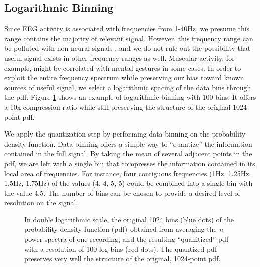 \subsection{Logarithmic Binning}

Since EEG activity is associated with frequencies from 1-40Hz, we presume this range contains the majority of relevant signal. However, this frequency range can be polluted with non-neural signals \cite{ball2009signal}, and we do not rule out the possibility that useful signal exists in other frequency ranges as well. Muscular activity, for example, might be correlated with mental gestures in some cases. In order to exploit the entire frequency spectrum while preserving our bias toward known sources of useful signal, we select a logarithmic spacing of the data bins through the pdf. Figure \ref{binnedEEGpowerspec} shows an example of logarithmic binning with 100 bins. It offers a 10x compression ratio while still preserving the structure of the original 1024-point pdf.

We apply the quantization step by performing data binning on the probability density function. Data binning offers a simple way to ``quantize'' the information contained in the full signal. By taking the mean of several adjacent points in the pdf, we are left with a single bin that compresses the information contained in its local area of frequencies. For instance, four contiguous frequencies (1Hz, 1.25Hz, 1.5Hz, 1.75Hz) of the values (4, 4, 5, 5) could be combined into a single bin with the value 4.5. The number of bins can be chosen to provide a desired level of  resolution on the signal.


\begin{figure}[!h]
  \vspace{-0.2cm}
  \centering
  {}
\caption{In double logarithmic scale, the original 1024 bins (blue dots) of the probability density function (pdf) obtained from averaging the \emph{n} power spectra of one recording, and the resulting ``quanitized''  pdf with a resolution of 100 log-bins (red dots). The quantized pdf preserves very well the structure of the original, 1024-point pdf. }
\label{binnedEEGpowerspec}
\vspace{-0.1cm}
\end{figure}

